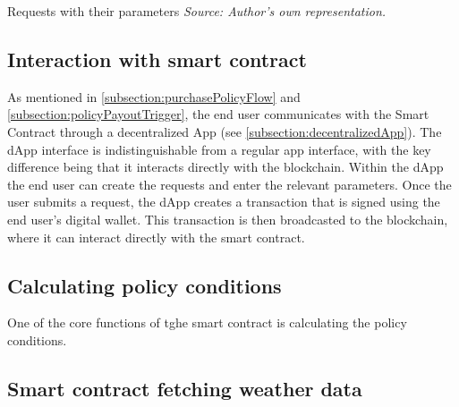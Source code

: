\begin{table}[h]
    \centering
    
    \caption{Requests with their parameters \textit{Source: Author's own representation.}}
    \label{tab:payoutFlowRequests}
\end{table}

\subsection{Interaction with smart contract}

As mentioned in \cref{subsection:purchasePolicyFlow} and \cref{subsection:policyPayoutTrigger}, the end user communicates with the Smart Contract through a decentralized App (see \cref{subsection:decentralizedApp}). The dApp interface is indistinguishable from a regular app interface, with the key difference being that it interacts directly with the blockchain. Within the dApp the end user can create the requests and enter the relevant parameters. Once the user submits a request, the dApp creates a transaction that is signed using the end user's digital wallet. This transaction is then broadcasted to the blockchain, where it can interact directly with the smart contract.

\subsection{Calculating policy conditions}

One of the core functions of tghe smart contract is calculating the policy conditions.


\subsection{Smart contract fetching weather data}